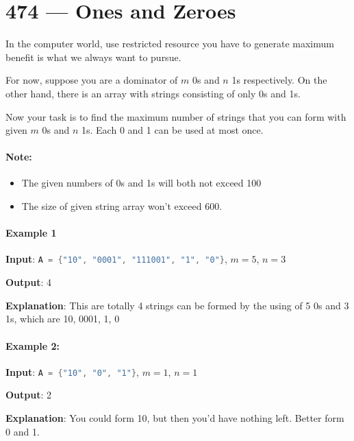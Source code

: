 \section{474 --- Ones and Zeroes}
In the computer world, use restricted resource you have to generate maximum benefit is what we always want to pursue.

For now, suppose you are a dominator of $m$ 0s and $n$ 1s respectively. On the other hand, there is an array with strings consisting of only 0s and 1s.

Now your task is to find the maximum number of strings that you can form with given $m$ 0s and $n$ 1s. Each 0 and 1 can be used at most once.

\paragraph{Note:}

\begin{itemize}
\item The given numbers of 0s and 1s will both not exceed 100
\item The size of given string array won't exceed 600.
\end{itemize} 

\paragraph{Example 1}

\begin{flushleft}
\textbf{Input}: \lstinline[language=C++, basicstyle=\small\ttfamily, keywordstyle=\bfseries\color{green!40!black}]|A = {"10", "0001", "111001", "1", "0"}|, $m = 5$, $n = 3$

\textbf{Output}: 4

\textbf{Explanation}: This are totally 4 strings can be formed by the using of 5 0s and 3 1s, which are 10, 0001, 1, 0
\end{flushleft}
 

\paragraph{Example 2:}
\begin{flushleft}

\textbf{Input}: \lstinline[language=C++, basicstyle=\small\ttfamily, keywordstyle=\bfseries\color{green!40!black}]|A = {"10", "0", "1"}|, $m = 1$, $n = 1$

\textbf{Output}: 2

\textbf{Explanation}: You could form 10, but then you'd have nothing left. Better form 0 and 1.
\end{flushleft}

